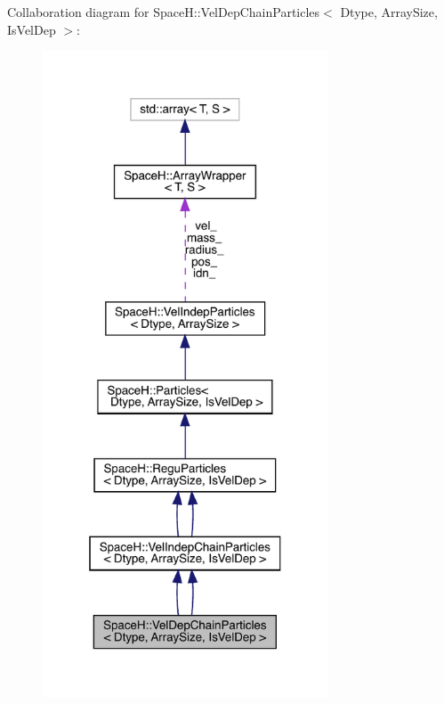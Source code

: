 Collaboration diagram for SpaceH\+:\+:Vel\+Dep\+Chain\+Particles$<$ Dtype, Array\+Size, Is\+Vel\+Dep $>$\+:
\nopagebreak
\begin{figure}[H]
\begin{center}
\leavevmode
\includegraphics[width=241pt]{class_space_h_1_1_vel_dep_chain_particles__coll__graph}
\end{center}
\end{figure}
